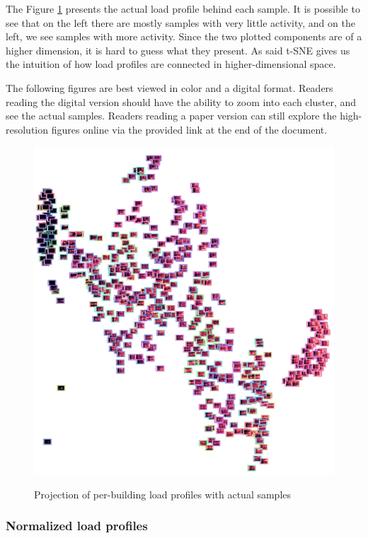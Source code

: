 The Figure \ref{fig:tsne_pb_img_scatter_allall} presents the actual load profile behind each sample. 
It is possible to see that on the left there are mostly samples with very little activity,
and on the left, we see samples with more activity.
Since the two plotted components are of a higher dimension, it is hard to guess what they present.
As said t-SNE gives us the intuition of how load profiles are connected in higher-dimensional space.

The following figures are best viewed in color and a digital format. 
Readers reading the digital version should have the ability to zoom into each cluster, and see the actual samples. 
Readers reading a paper version can still explore the high-resolution figures online via the provided link at the end of the document.

\begin{figure}[H]
	\centering
	\caption{Projection of per-building load profiles with actual samples}
	\includegraphics[width=.9\textwidth]{Figures/TSNE/TSNE_per_building/non_norm/img_scatter_allall.png}
	\label{fig:tsne_pb_img_scatter_allall}
\end{figure}

\subsubsection{Normalized load profiles}

